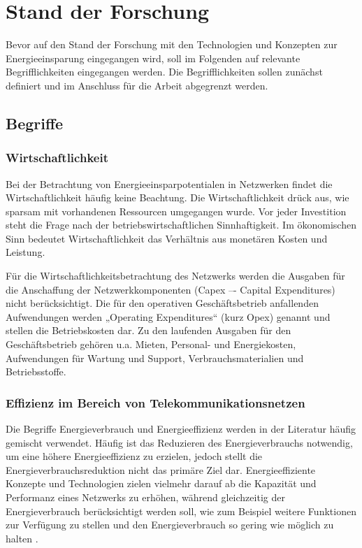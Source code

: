 \section{Stand der Forschung} \label{SdF}

Bevor auf den Stand der Forschung mit den Technologien und Konzepten zur Energieeinsparung eingegangen wird, soll im Folgenden auf relevante Begrifflichkeiten eingegangen werden. Die Begrifflichkeiten sollen zunächst definiert und im Anschluss für die Arbeit abgegrenzt werden.  

\subsection{Begriffe}

\subsubsection{Wirtschaftlichkeit}
  Bei der Betrachtung von Energieeinsparpotentialen in Netzwerken findet die Wirtschaftlichkeit häufig keine Beachtung. Die Wirtschaftlichkeit drück aus, wie sparsam mit vorhandenen Ressourcen umgegangen wurde.  Vor jeder Investition steht die Frage nach der betriebswirtschaftlichen Sinnhaftigkeit. Im ökonomischen Sinn bedeutet Wirtschaftlichkeit das Verhältnis aus monetären Kosten und Leistung. 

Für die Wirtschaftlichkeitsbetrachtung des Netzwerks werden die Ausgaben für die Anschaffung der Netzwerkkomponenten (Capex –- Capital Expenditures) nicht berück\-sichtigt. Die für den operativen Geschäftsbetrieb anfallenden Aufwendungen werden „Operating Expenditures“ (kurz Opex) genannt und stellen die Betriebskosten dar. Zu den laufenden Ausgaben für den Geschäfts\-betrieb gehören u.a. Mieten, Personal- und Energiekosten, Aufwendungen für Wartung und Support, Verbrauchsmaterialien und Betriebsstoffe. 

\subsubsection{Effizienz im Bereich von Telekommunikationsnetzen}
Die Begriffe Energieverbrauch und Energieeffizienz werden in der Literatur häufig gemischt verwendet. Häufig ist das Reduzieren des Energieverbrauchs notwendig, um eine höhere Energieeffizienz zu erzielen, jedoch stellt die Energieverbrauchsreduktion nicht das primäre Ziel dar. Energieeffiziente Konzepte und Technologien zielen vielmehr darauf ab die Kapazität und Performanz eines Netzwerks zu erhöhen, während gleichzeitig der Energieverbrauch berücksichtigt werden soll, wie zum Beispiel weitere Funktionen zur Verfügung zu stellen und den Energieverbrauch so gering wie möglich zu halten \cite{aleksic2013}.

